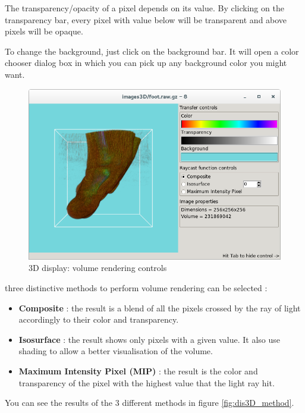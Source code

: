 \documentclass[a4paper,10pt,oneside]{article}
\begin{document}
The transparency/opacity of a pixel depends on its value. By clicking on the 
transparency bar, every pixel with value below will be transparent and above
pixels will be opaque.

To change the background, just click on the background bar. It will open a
color chooser dialog box in which you can pick up any background color you
might want.

\begin{figure}
\centering
\includegraphics[scale=0.5]{images/dis3D_volren_ctrl.png}
\caption{3D display: volume rendering controls}
\label{fig:dis3D_volren_ctrl}
\end{figure}

three distinctive methods to perform volume rendering can be selected :
\begin{itemize}
\item \textbf{Composite} : the result is a blend of all the pixels crossed by
the ray of light accordingly to their color and transparency.
\item \textbf{Isosurface} : the result shows only pixels with a given
value. It also use shading to allow a better visualisation of the volume.
\item \textbf{Maximum Intensity Pixel (MIP)} : the result is the color and
transparency of the pixel with the highest value that the light ray hit.
\end{itemize}
You can see the results of the 3 different methods in figure 
\ref{fig:dis3D_method}.
\end{document}
